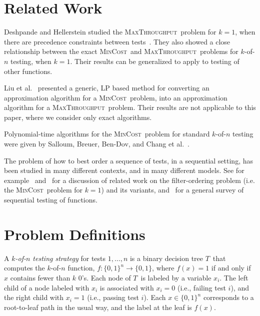 \documentclass{article}
\newcounter{ass}
\newcommand{\ens}[1]{\ensuremath{#1}}					\newcommand{\card}[1]{\ens{|#1|}}							\newcommand{\dotlist}[2]{\ens{#1,\ldots,#2}}
\newcommand{\anitem}{\ens{x}}
\newcommand{\valn}{\ens{n}}
\newcommand{\valk}{\ens{k}}
\newcommand{\maxthru}{\textsc{MaxThroughput}}
\newcommand{\mincost}{\textsc{MinCost}}
\newcommand{\kofn}{\valk-of-\valn}
\newcommand{\strategy}{\ens{T}}
\newcommand{\kfunc}{\ens{f}}                                                      \newcommand{\stratspace}{\ens{\mathcal{\strategy}}}		\newcommand{\stratspacec}{\ens{\mathcal{\strategy}_c}}	\newcommand{\perm}{\ens{\pi}}										\newcommand{\loadratio}{\ens{M}}									\newcommand{\flowamt}{\ens{m}}									\newcommand{\routing}{\ens{R}}										\newcommand{\commonr}{\ens{r}}                                                                                                      \newcommand{\unsat}{\ens{L}}											\newcommand{\satsuff}{\ens{Q}}										\newcommand{\vecy}{\ens{y}}
\newcommand{\retval}[1]{\ens{\anitem_{#1}}}					\newcommand{\pr}[1]{\ens{p_{#1}}}									\newcommand{\qr}[1]{\ens{q_{#1}}}									\newcommand{\op}[1]{\ens{O_{#1}}}									\newcommand{\megaop}[1]{\ens{E_{#1}}}
\begin{document}
\section{Related Work}

Deshpande and Hellerstein studied the 
\maxthru\ problem for $\valk=1$, when there are precedence constraints
between tests~\cite{DBLP:journals/talg/DeshpandeH12}.
They also showed a close relationship between
the exact \mincost\ and \maxthru\ problems for \kofn{} testing, when $k=1$.
Their results can be generalized to apply to testing of other functions.

Liu et al.~\cite{conf/pods/LiuPRY08} presented a generic, 
LP based method for converting an 
approximation algorithm for a \mincost\ problem, into an approximation
algorithm for a \maxthru\ problem. Their results are not applicable to
this paper, where we consider only exact algorithms.

Polynomial-time algorithms for the
\mincost\ problem for standard \kofn{} testing were given
by Salloum, Breuer, 
Ben-Dov, and Chang et al.~\cite{salloumphd,salloumbreuer,bendov81,journals/tc/ChangSF90,salloumfaster}.

The problem of how to best order a sequence of tests, in
a sequential setting, has been studied in many
different contexts, and in many different models.   
See for example~\cite{conf/pods/LiuPRY08} and~\cite{journals/talg/CondonDHW09}
for a discussion of related work on                                                                                        
the filter-ordering problem (i.e. the \mincost\ problem for $k=1$)
and its variants, and~\cite{unluyurt2004189} for a general survey 
of sequential testing of functions.







\section{Problem Definitions}


A {\em \kofn{} testing strategy} for tests $1, \ldots, \valn$ is a binary decision tree 
\strategy\ that computes the \kofn{} function, 
$\kfunc:\{0,1\}^n \rightarrow \{0,1\}$, where $\kfunc(x) = 1$ if and only if
\anitem{} contains fewer than $\valk$ 0's.
Each node of \strategy\ is labeled by a variable $\retval i$.
The left child of a node labeled with \retval{i} is associated
with $\retval i = 0$ (i.e., failing test $i$), and the right child 
with $\retval i = 1$ (i.e., passing test $i$). 
Each $\anitem \in \{0,1\}^{\valn}$ corresponds to a root-to-leaf path
in the usual way, and the label at the leaf is  
$\kfunc(x)$.
\end{document}
